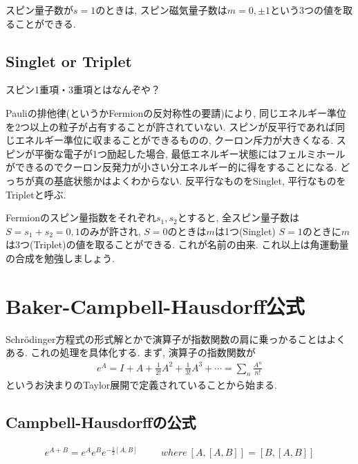\documentclass[10.5pt,a4paper]{jreport}
\begin{document}
スピン量子数が$s = 1$のときは, スピン磁気量子数は$m = 0, \pm 1$という3つの値を取ることができる.
\subsection{Singlet or Triplet}
スピン1重項・3重項とはなんぞや？

Pauliの排他律(というかFermionの反対称性の要請)により, 同じエネルギー準位を2つ以上の粒子が占有することが許されていない. スピンが反平行であれば同じエネルギー準位に収まることができるものの, クーロン斥力が大きくなる. スピンが平衡な電子が1つ励起した場合, 最低エネルギー状態にはフェルミホールができるのでクーロン反発力が小さい分エネルギー的に得をすることになる. どっちが真の基底状態かはよくわからない. 反平行なものをSinglet, 平行なものをTripletと呼ぶ.

Fermionのスピン量指数をそれぞれ$s_1, s_2$とすると, 全スピン量子数は$S = s_1 + s_2 = 0, 1$のみが許され, $S = 0$のときは$m$は1つ(Singlet) $S = 1$のときに$m$は3つ(Triplet)の値を取ることができる. これが名前の由来. これ以上は角運動量の合成を勉強しましょう.
\section{Baker-Campbell-Hausdorff公式}
Schr\"odinger方程式の形式解とかで演算子が指数関数の肩に乗っかることはよくある. これの処理を具体化する. まず, 演算子の指数関数が
\begin{eqnarray}
  e^A = I + A + \frac{1}{2!}A^2 + \frac{1}{3!}A^3 + \cdots = \sum_n\frac{A^n}{n!}
\end{eqnarray}
というお決まりのTaylor展開で定義されていることから始まる. 
\subsection{Campbell-Hausdorffの公式}
\begin{screen}
  \begin{eqnarray}
    e^{A+B} = e^{A}e^{B}e^{-\frac{1}{2}[A, B]}\hspace{1cm}where\ [A, [A, B]] = [B, [A, B]]
  \end{eqnarray}
\end{screen}
\end{document}
